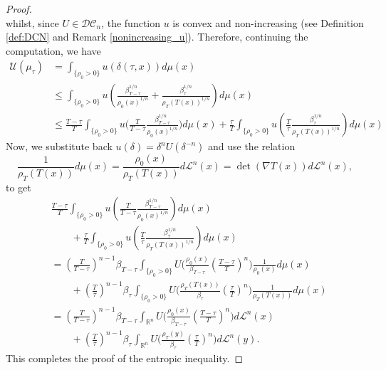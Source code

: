 \documentclass[reqno]{amsart}
\theoremstyle{plain}
\theoremstyle{definition}
\theoremstyle{remark}
\begin{document}
\begin{proof}
\begin{equation}
			\end{equation}
			whilst, since $U\in\mathcal{DC}_n$, the function $u$ is convex and non-increasing (see Definition \ref{def:DCN} and Remark \ref{nonincreasing_u}). Therefore, continuing the computation, we have
			\begin{align}
				\mathcal{U}(\mu_\tau)&=\int_{\{\rho_0>0\}}u\left(\delta(\tau,x)\right)d\mu(x)\\
				&\leq\int_{\{\rho_0>0\}}u\left(\frac{\beta_{T-\tau}^{1/n}}{\rho_0(x)^{1/n}} +\frac{\beta_{\tau}^{1/n}}{\rho_T(T(x))^{1/n}}\right)d\mu(x)\\
				&\leq \frac{T-\tau}{T}\int_{\{\rho_0>0\}}u\bigg(\frac{T}{T-\tau}\frac{\beta_{T-\tau}^{1/n}}{\rho_0(x)^{1/n}}\bigg)d\mu(x)
				+\frac{\tau}{T}\int_{\{\rho_0>0\}}u\left(\frac{T}{\tau}\frac{\beta_{\tau}^{1/n}}{\rho_T(T(x))^{1/n}}\right)d\mu(x)
			\end{align}
			Now, we substitute back $u(\delta)=\delta^{n}U(\delta^{-n})$ and use the relation 
			\begin{equation}
				\frac{1}{\rho_T(T(x))}d\mu(x)=\frac{\rho_0(x)}{\rho_T(T(x))}d\mathscr{L}^n(x)=\det(\nabla T(x))d\mathscr{L}^n(x),
			\end{equation}
			to get
			\begin{align}
				&\frac{T-\tau}{T}\int_{\{\rho_0>0\}}u\left(\frac{T}{T-\tau}\frac{\beta_{T-\tau}^{1/n}}{\rho_0(x)^{1/n}}\right)d\mu(x)\\
				&\qquad+\frac{\tau}{T}\int_{\{\rho_0>0\}}u\left(\frac{T}{\tau}\frac{\beta_{\tau}^{1/n}}{\rho_T(T(x))^{1/n}}\right)d\mu(x)\\
				&=\left(\frac{T}{T-\tau}\right)^{n-1}\beta_{T-\tau}\int_{\{\rho_0>0\}}U\bigg(\frac{\rho_0(x)}{\beta_{T-\tau}}
				\left(\frac{T-\tau}{T}\right)^n\bigg)\frac{1}{\rho_0(x)}d\mu(x)\\
				&\qquad+\left(\frac{T}{\tau}\right)^{n-1}\beta_{\tau}\int_{\{\rho_0>0\}}U\bigg(\frac{\rho_T(T(x))}{\beta_{\tau}}
				\left(\frac{\tau}{T}\right)^n\bigg)\frac{1}{\rho_T(T(x))}d\mu(x)\\
				&=\left(\frac{T}{T-\tau}\right)^{n-1}\beta_{T-\tau}\int_{\mathbb{R}^n}U\bigg(\frac{\rho_0(x)}{\beta_{T-\tau}}
				\left(\frac{T-\tau}{T}\right)^n\bigg)d\mathscr{L}^n(x)\\
				&\qquad+\left(\frac{T}{\tau}\right)^{n-1}\beta_{\tau}\int_{\mathbb{R}^n}U\bigg(\frac{\rho_T(y)}{\beta_{\tau}}
				\left(\frac{\tau}{T}\right)^n\bigg)d\mathscr{L}^n(y).
			\end{align}
			This completes the proof of the entropic inequality.
		\end{proof}
        
\end{document}
